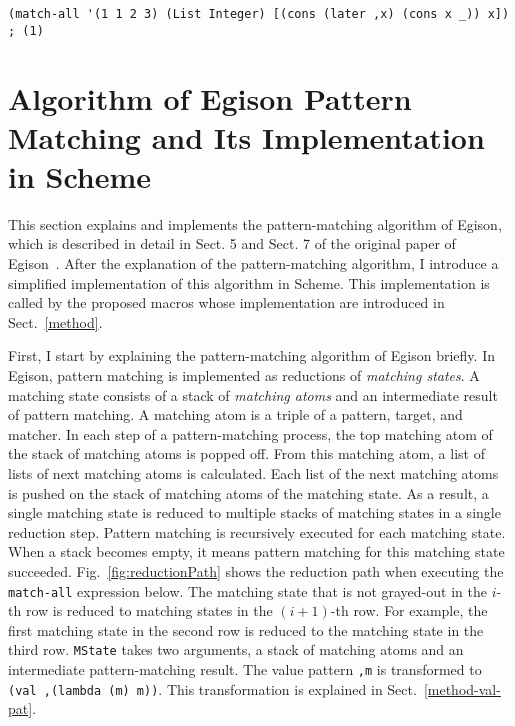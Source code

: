 \documentclass[acmlarge]{acmart}
\newcommand{\renew}[1]{\textcolor{purple}{#1}}
\begin{document}
\begin{lstlisting}[language=egison]
(match-all '(1 1 2 3) (List Integer) [(cons (later ,x) (cons x _)) x]) ; (1)
\end{lstlisting}



\section{Algorithm of Egison Pattern Matching and Its Implementation in Scheme}\label{algorithm}

This section explains and implements the pattern-matching algorithm of Egison, which is described in detail in Sect. 5 and Sect. 7 of the original paper of Egison~\cite{egi2018aplas}.
After the explanation of the pattern-matching algorithm, I introduce a simplified implementation of this algorithm in Scheme.
This implementation is called by the proposed macros whose implementation are introduced in Sect.~\ref{method}.

\medskip

First, I start by explaining the pattern-matching algorithm of Egison briefly.
In Egison, pattern matching is implemented as reductions of \emph{matching states}.
A matching state consists of a stack of \emph{matching atoms} and an intermediate result of pattern matching.
A matching atom is a triple of a pattern, target, and matcher.
In each step of a pattern-matching process, the top matching atom of the stack of matching atoms is popped off.
From this matching atom, a list of lists of next matching atoms is calculated.
Each list of the next matching atoms is pushed on the stack of matching atoms of the matching state.
As a result, a single matching state is reduced to multiple stacks of matching states in a single reduction step.
Pattern matching is recursively executed for each matching state.
When a stack becomes empty, it means pattern matching for this matching state succeeded.
Fig.~\ref{fig:reductionPath} shows the reduction path when executing the \lstinline{match-all} expression below.
The matching state that is not grayed-out in the $i$-th row is reduced to matching states in the $(i+1)$-th row.
For example, the first matching state in the second row is reduced to the matching state in the third row.
\texttt{MState} takes two arguments, a stack of matching atoms and an intermediate pattern-matching result.
The value pattern \lstinline{,m} is transformed to \lstinline{(val ,(lambda (m) m))}.
This transformation is explained in Sect.~\ref{method-val-pat}.
\end{document}
